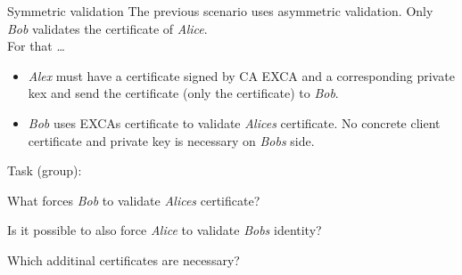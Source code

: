 ﻿\begin{frame}{Symmetric validation}
    The \alert{previous scenario} uses \alert{asymmetric validation}. Only \textit{Bob} validates the certificate of \textit{Alice}.\\
    For that \ldots
    \begin{itemize}
        \item \alert{\textit{Alex} must have a certificate signed by CA EXCA} and a corresponding \alert{private kex} and \alert{send the certificate} (only the certificate) to \textit{Bob}.
        \item \textit{Bob} \alert{uses EXCAs certificate} to validate \textit{Alices} certificate. \alert{No concrete} client certificate and private key is necessary on \textit{Bobs} side.
    \end{itemize}
    \begin{exampleblock}{Task (group):}
        \begin{description}[???]
            \item [???] What forces \textit{Bob} to \alert{validate} \textit{Alices} certificate?
            \item [???] Is it possible to also force \textit{Alice} to validate \textit{Bobs} identity?
            \item [???] Which additinal certificates are necessary?
        \end{description}
    \end{exampleblock}
\end{frame}

